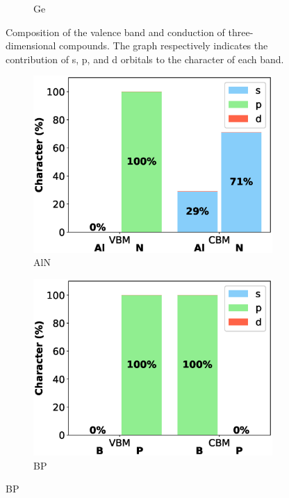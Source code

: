 \begin{figure}[!ht]
\begin{subfigure}{0.3\textwidth}
  \caption{Ge}
\end{subfigure}\hfil %

        \caption{Composition of the valence band and conduction of three-dimensional compounds. The graph respectively indicates the contribution of s, p, and d orbitals to the character of each band.}
        \label{fig:3d_compounds_character}
\end{figure}

\begin{figure}[!ht]
\centering %
\begin{subfigure}{0.45\textwidth}
  \includegraphics[width=\linewidth]{images/aln_2d_composition.eps}
  \caption{AlN}
\end{subfigure}\hfil %
\begin{subfigure}{0.45\textwidth}
  \includegraphics[width=\linewidth]{images/bp_2d_composition.eps}
  \caption{BP}
\end{subfigure}


\end{figure}
